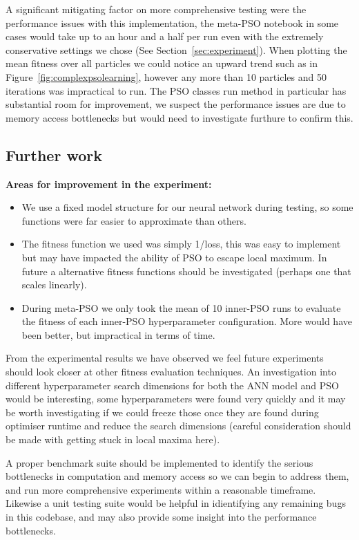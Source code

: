 \documentclass[12pt]{article}
\begin{document}
A significant mitigating factor on more comprehensive testing were the performance issues with this implementation, the meta-PSO notebook in some cases would take up to an hour and a half per run even with the extremely conservative settings we chose (See Section~\ref{sec:experiment}).
When plotting the mean fitness over all particles we could notice an upward trend such as in Figure~\ref{fig:complexpsolearning}, however any more than 10 particles and 50 iterations was impractical to run.
The PSO classes run method in particular has substantial room for improvement, we suspect the performance issues are due to memory access bottlenecks but would need to investigate furthure to confirm this.


\subsection{Further work}
\textbf{Areas for improvement in the experiment:}
\begin{itemize}
    \item We use a fixed model structure for our neural network during testing, so some functions were far easier to approximate than others.
    \item The fitness function we used was simply 1/loss, this was easy to implement but may have impacted the ability of PSO to escape local maximum. In future a alternative fitness functions should be investigated (perhaps one that scales linearly).
    \item During meta-PSO we only took the mean of 10 inner-PSO runs to evaluate the fitness of each inner-PSO hyperparameter configuration. More would have been better, but impractical in terms of time.
\end{itemize}
From the experimental results we have observed we feel future experiments should look closer at other fitness evaluation techniques. 
An investigation into different hyperparameter search dimensions for both the ANN model and PSO would be interesting, some hyperparameters were found very quickly and it may be worth investigating if we could freeze those once they are found during optimiser runtime and reduce the search dimensions (careful consideration should be made with getting stuck in local maxima here). 

A proper benchmark suite should be implemented to identify the serious bottlenecks in computation and memory access so we can begin to address them, and run more comprehensive experiments within a reasonable timeframe.
Likewise a unit testing suite would be helpful in idientifying any remaining bugs in this codebase, and may also provide some insight into the performance bottlenecks.
\end{document}
